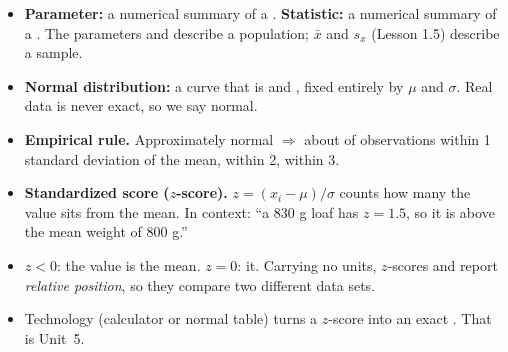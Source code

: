 \boxguard[12]
\begin{tcolorbox}[enhanced, colback=sky, colframe=navy, boxrule=0.8pt, arc=2mm,
    left=3mm, right=3mm, top=1.5mm, bottom=1.5mm, breakable,
    fonttitle=\bfseries\small\color{white}, title={QuickNotes: The Normal Distribution and z-Scores},
    attach boxed title to top left={yshift=-2mm, xshift=4mm},
    boxed title style={colback=navy, colframe=navy, arc=1.5mm}]
\small
\begin{itemize}[leftmargin=1.1em, itemsep=2pt]
  \item \textbf{Parameter:} a numerical summary of a \blank{2.4cm}. \textbf{Statistic:} a
        numerical summary of a \blank{2.0cm}. The parameters \blank{1.2cm} and \blank{1.2cm}
        describe a population; $\bar x$ and $s_x$ (Lesson 1.5) describe a sample.
  \item \textbf{Normal distribution:} a curve that is \blank{2.8cm} and \blank{2.4cm}, fixed
        entirely by $\mu$ and $\sigma$. Real data is never exact, so we say \blank{3.0cm} normal.
  \item \textbf{Empirical rule.} Approximately normal $\Rightarrow$ about \blank{1.7cm} of
        observations within 1 standard deviation of the mean, \blank{1.7cm} within 2,
        \blank{1.7cm} within 3.
  \item \textbf{Standardized score ($z$-score).} $z = (x_i - \mu)/\sigma$ counts how many
        \blank{4.0cm} the value sits from the mean. In context: ``a 830 g loaf has $z = 1.5$, so
        it is \blank{4.9cm} above the mean weight of 800 g.''
  \item $z < 0$: the value is \blank{2.0cm} the mean. $z = 0$: \blank{2.6cm} it. Carrying no
        units, $z$-scores and \blank{2.4cm} report \emph{relative position}, so they compare two
        different data sets.
  \item Technology (calculator or normal table) turns a $z$-score into an exact \blank{2.4cm}.
        That is Unit~5.
\end{itemize}
\end{tcolorbox}

